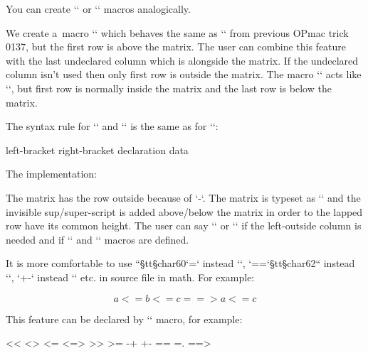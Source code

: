 You can create `\matrixL` or `\matrixLR` macros analogically. 


 


We create a~macro `\matrixA` which behaves the same as `\matrixR` from previous OPmac trick 0137, but the first row is above the matrix. The user can combine this feature with the last undeclared column which is alongside the matrix. If the undeclared column isn't used then only first row is outside the matrix. The macro `\matrixB` acts like `\matrixA`, but first row is normally inside the matrix and the last row is below the matrix. 



The syntax rule for `\matrixA` and `\matrixB` is the same as for `\matrixR`: 

\begtt
\matrixA left-bracket right-bracket {declaration} {data} 
\endtt


The implementation: 

\begtt
\def\matrixA#1#2#3#4{%
   {\mathop{\matrixI#1#2{#3}{\noalign{\kern-\normalbaselineskip}#4}}%
    \limits^{\textstyle\mathstrut}}} 
\def\matrixB#1#2#3#4{%
   {\mathop{\matrixI#1#2{#3}{#4\crcr\noalign{\kern-\normalbaselineskip}}}%
    \limits_{\textstyle\mathstrut}}} 
\let\matrixI=\matrixR  %
\endtt


The matrix has the row outside because of `\kern-\normalbaselineskip`. The matrix is typeset as `\mathop` and the invisible sup/super-script is added above/below the matrix in order to the lapped row have its common height. The user can say `\let\matrixI=\matrixL` or `\let\matrixI=\matrixLR` if the left-outside column is needed and if `\matrixL` and `\matrixLR` macros are defined. 


 





It is more comfortable to use ``{§tt§char60}`=` instead `\leq`, `==`{§tt§char62}`` instead `\Rightarrow`, `+-` instead `\pm` etc. in source file in math. For example: 

\begtt
$$ a <= b <= c ==> a <= c $$ 
\endtt


This feature can be declared by `\mspecdef` macro, for example: 

\begtt
\mspecdef <<   \ll 
\mspecdef <>   \neq 
\mspecdef <=   \leq 
\mspecdef <=>  \Leftrightarrow 
\mspecdef >>   \gg 
\mspecdef >=   \geq 
\mspecdef -+   \mp 
\mspecdef +-   \pm 
\mspecdef ==   \equiv 
\mspecdef =.   \doteq 
\mspecdef ==>  \Rightarrow 
\endtt


